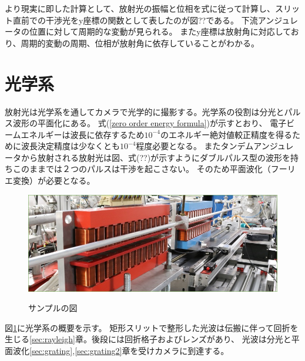 \documentclass[a4paper,11pt,uplatex]{jsbook}
\begin{document}
より現実に即した計算として、放射光の振幅と位相を式に従って計算し、スリット直前での干渉光をy座標の関数として表したのが図??である。
下流アンジュレータの位置に対して周期的な変動が見られる。
またy座標は放射角に対応しており、周期的変動の周期、位相が放射角に依存していることがわかる。


\section{光学系}\label{sec:optics}
放射光は光学系を通してカメラで光学的に撮影する。光学系の役割は分光とパルス波形の平面化にある。
式(\ref{zero order energy formula})が示すとおり、
電子ビームエネルギーは波長に依存するため$10^{-4}$のエネルギー絶対値較正精度を得るために波長決定精度は少なくとも$10^{-4}$程度必要となる。
またタンデムアンジュレータから放射される放射光は図、式(??)が示すようにダブルパルス型の波形を持ちこのままでは２つのパルスは干渉を起こさない。
そのため平面波化（フーリエ変換）が必要となる。
\begin{figure}[tb]
  \centering
  \includegraphics[width=0.8\linewidth]{image/1-1.jpg}\\
  \caption{サンプルの図}
  \label{optics_schematic}
\end{figure}
図\ref{optics_schematic}に光学系の概要を示す。
矩形スリットで整形した光波は伝搬に伴って回折を生じる\ref{sec:rayleigh}章。後段には回折格子およびレンズがあり、
光波は分光と平面波化\ref{sec:grating},\ref{sec:grating2}章を受けカメラに到達する。
\end{document}
